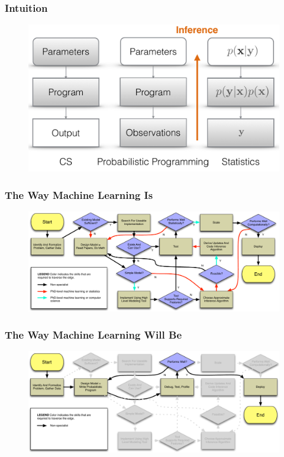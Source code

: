 \documentclass[usenames,dvipsnames]{beamer}
\begin{document}
\begin{frame}
  \frametitle{Intuition}
  \begin{figure}[ht]
    \centering
    \includegraphics[height=0.7\textheight,keepaspectratio]{figures/ppl_similarity.pdf}
    \caption*{\label{fig:ppl-similarity}}
  \end{figure}
\end{frame}
\begin{frame}
  \frametitle{The Way Machine Learning Is}
  \begin{figure}[ht]
    \includegraphics[width=1\textwidth,keepaspectratio]{figures/ml_current.pdf}
    \caption*{\label{fig:ml-current}}
  \end{figure}
\end{frame}
\begin{frame}
  \frametitle{The Way Machine Learning Will Be }
  \begin{figure}[ht]
    \includegraphics[width=1\textwidth,keepaspectratio]{figures/ml_future.pdf}
    \caption*{\label{fig:ml-future}}
  \end{figure}
\end{frame}
\end{document}
